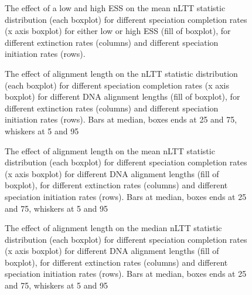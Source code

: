 \begin{figure}
  \caption{
    The effect of a low and high ESS
    on the mean nLTT statistic distribution (each boxplot) 
    for different speciation completion rates (x axis boxplot)
    for either low or high ESS (fill of boxplot),
    for different extinction rates (columns)
    and different speciation initiation rates (rows). 
  }
  \label{fig:error_low_high_ess}
\end{figure}

\begin{figure}
  \caption{
    The effect of alignment length
    on the nLTT statistic distribution (each boxplot) 
    for different speciation completion rates (x axis boxplot)
    for different DNA alignment lengths (fill of boxplot),
    for different extinction rates (columns)
    and different speciation initiation rates (rows). 
    Bars at median,
    boxes ends at 25 and 75,
    whiskers at 5 and 95
  }
  \label{fig:error_alignment_length}
\end{figure}

\begin{figure}
  \caption{
    The effect of alignment length
    on the mean nLTT statistic distribution (each boxplot) 
    for different speciation completion rates (x axis boxplot)
    for different DNA alignment lengths (fill of boxplot),
    for different extinction rates (columns)
    and different speciation initiation rates (rows). 
    Bars at median,
    boxes ends at 25 and 75,
    whiskers at 5 and 95
  }
  \label{fig:error_alignment_length_mean}
\end{figure}

\begin{figure}
  \caption{
    The effect of alignment length
    on the median nLTT statistic distribution (each boxplot) 
    for different speciation completion rates (x axis boxplot)
    for different DNA alignment lengths (fill of boxplot),
    for different extinction rates (columns)
    and different speciation initiation rates (rows). 
    Bars at median,
    boxes ends at 25 and 75,
    whiskers at 5 and 95
  }
  \label{fig:error_alignment_length_median}
\end{figure}


